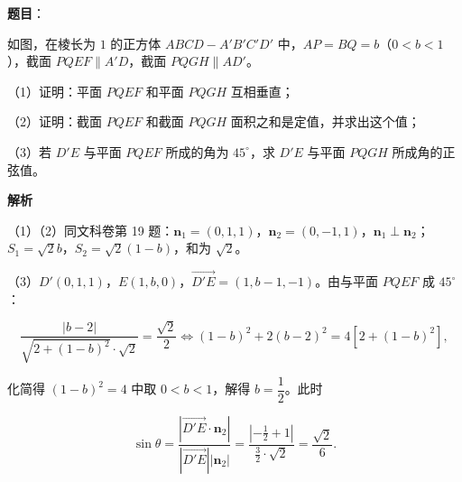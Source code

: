 \begin{answer}

\textbf{题目}：

如图，在棱长为 $1$ 的正方体 $ABCD-A'B'C'D'$ 中，$AP=BQ=b$（$0<b<1$），截面 $PQEF\parallel A'D$，截面 $PQGH\parallel AD'$。

（1）证明：平面 $PQEF$ 和平面 $PQGH$ 互相垂直；

（2）证明：截面 $PQEF$ 和截面 $PQGH$ 面积之和是定值，并求出这个值；

（3）若 $D'E$ 与平面 $PQEF$ 所成的角为 $45^\circ$，求 $D'E$ 与平面 $PQGH$ 所成角的正弦值。
\nopagebreak[4]
\begin{center}\end{center}
\nopagebreak[4]
\textbf{解析}

（1）（2）同文科卷第 19 题：$\boldsymbol n_1=(0,1,1)$，$\boldsymbol n_2=(0,-1,1)$，$\boldsymbol n_1\perp\boldsymbol n_2$；$S_1=\sqrt2b$，$S_2=\sqrt2(1-b)$，和为 $\sqrt2$。

（3）$D'(0,1,1)$，$E(1,b,0)$，$\overrightarrow{D'E}=(1,b-1,-1)$。由与平面 $PQEF$ 成 $45^\circ$：

\nopagebreak[4]
\[\frac{|b-2|}{\sqrt{2+(1-b)^2}\cdot\sqrt2}=\frac{\sqrt2}2\iff(1-b)^2+2(b-2)^2=4\left[2+(1-b)^2\right],\]

化简得 $(1-b)^2=4$ 中取 $0<b<1$，解得 $b=\dfrac12$。此时

\nopagebreak[4]
\[\sin\theta=\frac{\left|\overrightarrow{D'E}\cdot\boldsymbol n_2\right|}{\left|\overrightarrow{D'E}\right|\left|\boldsymbol n_2\right|}=\frac{\left|-\frac12+1\right|}{\frac32\cdot\sqrt2}=\frac{\sqrt2}6.\]


\end{answer}
